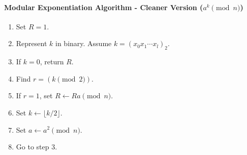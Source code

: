 \documentclass{subfile}
\begin{document}
	\paragraph{Modular Exponentiation Algorithm - Cleaner Version ($a^k\pmod n$)}
		\begin{enumerate}[1.]
			\item Set $R=1$.
			\item Represent $k$ in binary. Assume $k=(x_0x_1\cdots x_l)_2$.
			\item If $k=0$, return $R$.
			\item Find $r = (k\pmod2)$.
			\item If $r=1$, set $R\longleftarrow Ra\pmod n$.
			\item Set $k\longleftarrow \lfloor k/2\rfloor$.
			\item Set $a\longleftarrow a^2\pmod n$.
			\item Go to step $3$.
		\end{enumerate}
\end{document}
